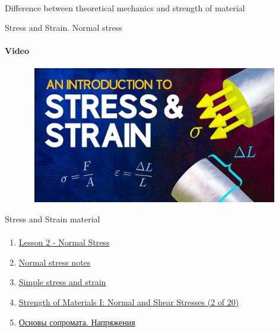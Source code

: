 \documentclass[aspectratio=169]{beamer}
\begin{document}
\begin{frame}[c]{}
\framesubtitle{}
    \LARGE \centering
    Difference between theoretical mechanics and strength of material
\end{frame}

\begin{frame}[t]{Stress and Strain. Normal stress}
    \framesubtitle{Video}
    \vspace{-0.6cm}
    \begin{figure}[H]
        \href{https://youtu.be/aQf6Q8t1FQE}{
            \centering\includegraphics[height=6cm,width=1\textwidth,keepaspectratio]{stress_video.jpg}}
        \label{fig:stress_video.jpg}
    \end{figure}
\end{frame}

\begin{frame}[t]{Stress and Strain material}
    \framesubtitle{}
    \begin{enumerate}
        \item \href{https://youtu.be/_muJSo9l18A}{Lesson 2 - Normal Stress}
        \item \href{https://youtu.be/zm-N4YQsU_M}{Normal stress notes}
        \item \href{https://youtu.be/YkdQB0JnJD4}{Simple stress and strain}
        \item \href{https://youtu.be/ywMTY8DZcsk}{Strength of Materials I: Normal and Shear Stresses (2 of 20)}
        \item \href{https://youtu.be/JB3y44-wnHQ}{Основы сопромата. Напряжения}
    \end{enumerate}
    \end{frame}
\end{document}
